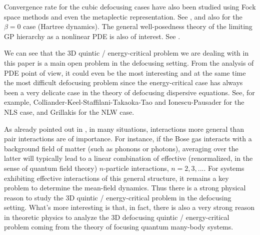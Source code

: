 \documentclass[12pt,letterpaper,leqno]{amsart}
\theoremstyle{plain}
\numberwithin{equation}{section}
\numberwithin{theorem}{section}
\numberwithin{proposition}{section}
\numberwithin{lemma}{section}
\numberwithin{corollary}{section}
\begin{document}
Convergence rate for the cubic defocusing cases have also been studied using
Fock space methods and even the metaplectic representation. See \cite%
{SchleinNew,GM1,GM2,Kuz,Kuz2}, and also \cite%
{Frolich,E-Y1,KnowlesAndPickl,RodnianskiAndSchlein,MichelangeliSchlein,GMM1,GMM2,Chen2ndOrder,AKS,Ammari2,Ammari1,Lewin}
for the $\beta =0$ case (Hartree dynamics). The general well-posedness
theory of the limiting GP hierarchy as a nonlinear PDE is also of interest.
See \cite{TCNPNT,Sohinger2,SoSt13,MNPS}.

We can see that the 3D quintic / energy-critical problem we are dealing with
in this paper is a main open problem in the defocusing setting. From the
analysis of PDE point of view, it could even be the most interesting and at
the same time the most difficult defocusing problem since the
energy-critical case has always been a very delicate case in the theory of
defocusing dispersive equations. See, for example,
Colliander-Keel-Staffilani-Takaoka-Tao \cite{CKSTT} and Ionescu-Pausader 
\cite{IP} for the NLS case, and Grillakis \cite{ManosNLW} for the NLW case.

As already pointed out in \cite{TChenAndNP}, in many situations,
interactions more general than pair interactions are of importance. For
instance, if the Bose gas interacts with a background field of matter (such
as phonons or photons), averaging over the latter will typically lead to a
linear combination of effective (renormalized, in the sense of quantum field
theory) $n$-particle interactions, $n=2,3,....$ For systems exhibiting
effective interactions of this general structure, it remains a key problem
to determine the mean-field dynamics. Thus there is a strong physical reason
to study the 3D quintic / energy-critical problem in the defocusing setting.
What's more interesting is that, in fact, there is also a very strong reason
in theoretic physics to analyze the 3D defocusing quintic / energy-critical
problem coming from the theory of focusing quantum many-body systems.
\end{document}

